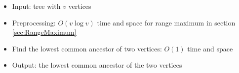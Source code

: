 \begin{itemize}
	\item Input: tree with $v$ vertices
	\item Preprocessing: $O(v\log{v})$ time and space for range maximum in section \ref{sec:RangeMaximum}
	\item Find the lowest common ancestor of two vertices: $O(1)$ time and space
	\item Output: the lowest common ancestor of the two vertices
\end{itemize}